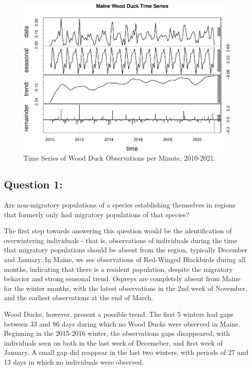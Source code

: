 \documentclass[
  12pt,
]{article}
\begin{document}
\begin{figure}
\centering
\includegraphics{Project_report_ME_files/figure-latex/Time.SeriesW-1.pdf}
\caption{Time Series of Wood Duck Observations per Minute, 2010-2021.}
\end{figure}

\hypertarget{question-1}{%
\subsection{Question 1:}\label{question-1}}

Are non-migratory populations of a species establishing themselves in
regions that formerly only had migratory populations of that species?

The first step towards answering this question would be the
identification of overwintering individuals - that is, observations of
individuals during the time that migratory populations should be absent
from the region, typically December and January. In Maine, we see
observations of Red-Winged Blackbirds during all months, indicating that
there is a resident population, despite the migratory behavior and
strong seasonal trend. Ospreys are completely absent from Maine for the
winter months, with the latest observations in the 2nd week of November,
and the earliest observations at the end of March.

Wood Ducks, however, present a possible trend. The first 5 winters had
gaps between 33 and 86 days during which no Wood Ducks were observed in
Maine. Beginning in the 2015-2016 winter, the observations gaps
disappeared, with individuals seen on both in the last week of
Decemeber, and first week of January. A small gap did reappear in the
last two winters, with periods of 27 and 13 days in which no individuals
were observed.
\end{document}
